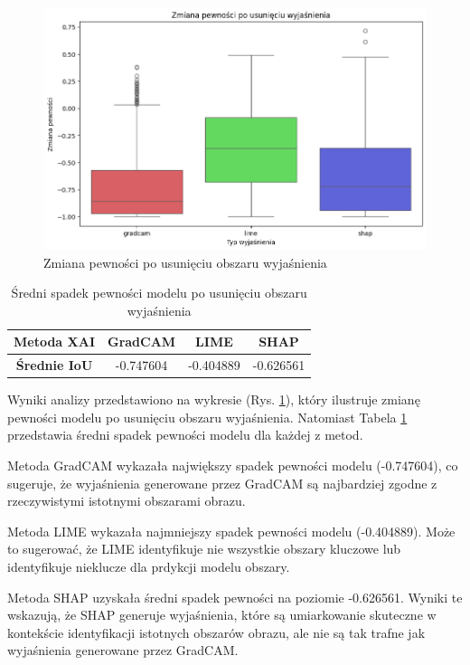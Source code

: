 \begin{figure}[h]
	\centering\includegraphics[width=.9\textwidth]{img/base_confidence_no_exp}
	\caption{Zmiana pewności po usunięciu obszaru wyjaśnienia}  \label{rys:base_confidence_no_exp}
\end{figure}

\begin{table}[h]
	\centering
	\begin{tabular}{|c|c|c|c|}
		\hline
		\textbf{Metoda XAI}  & \textbf{GradCAM} & \textbf{LIME} & \textbf{SHAP} \\
		\hline
		\textbf{Średnie IoU} & -0.747604        & -0.404889     & -0.626561     \\
		\hline
	\end{tabular}
	\caption{Średni spadek pewności modelu po usunięciu obszaru wyjaśnienia}
	\label{tab:base_confidence_no_exp}
\end{table}

Wyniki analizy przedstawiono na wykresie (Rys. \ref{rys:base_confidence_no_exp}), który ilustruje zmianę pewności modelu po usunięciu obszaru wyjaśnienia.
Natomiast Tabela \ref{tab:base_confidence_no_exp} przedstawia średni spadek pewności modelu dla każdej z metod.

Metoda GradCAM wykazała największy spadek pewności modelu (-0.747604), co sugeruje, że wyjaśnienia generowane przez GradCAM są najbardziej zgodne z rzeczywistymi istotnymi obszarami obrazu.

Metoda LIME wykazała najmniejszy spadek pewności modelu (-0.404889).
Może to sugerować, że LIME identyfikuje nie wszystkie obszary kluczowe lub identyfikuje nieklucze dla prdykcji modelu obszary.

Metoda SHAP uzyskała średni spadek pewności na poziomie -0.626561.
Wyniki te wskazują, że SHAP generuje wyjaśnienia, które są umiarkowanie skuteczne w kontekście identyfikacji istotnych obszarów obrazu, ale nie są tak trafne jak wyjaśnienia generowane przez GradCAM.

